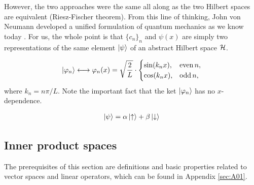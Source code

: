 However, the two approaches were the same all along as the two Hilbert spaces are equivalent (Riesz-Fischer theorem).
From this line of thinking, John von Neumann developed a unified formulation of quantum mechanics as we know today \cite{landsman,jammer}. For us, the whole point is that $\{c_n\}_n$ and $\psi(x)$ are simply two representations of the same element  $\ket{\psi}$ of an abstract Hilbert space $\mathcal{H}$.

\begin{example}\leavevmode
	\begin{align}
		\ket{\varphi_n} \longleftrightarrow \varphi_n(x) = \sqrt{\frac{2}{L}} \cdot
		\begin{cases}
			 \sin(k_n x), & \textrm{even}\, n, \\
			 \cos(k_n x), & \textrm{odd}\, n,
		\end{cases}
	\end{align}
	where $k_n = n\pi/L$.
Note the important fact that the ket $\ket{\varphi_n}$ has no $x$-dependence.
\end{example}

\begin{example}[Spin-1/2]\leavevmode
	\begin{align}
		\ket{\psi} = \alpha\ket{\uparrow} + \beta\ket{\downarrow}
	\end{align}
\end{example}



\subsection{Inner product spaces}

The prerequisites of this section are definitions and basic properties related to vector spaces and linear operators, which can be found in Appendix \ref{sec:A01}.

